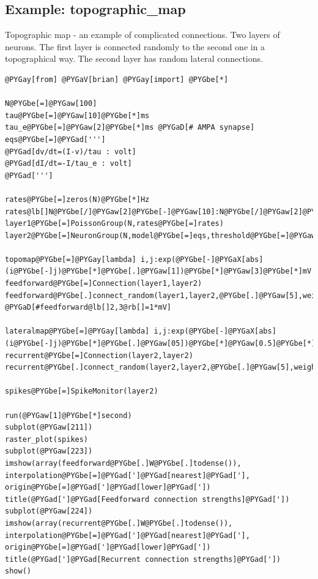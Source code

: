 \documentclass[letterpaper,10pt]{manual}
\begin{document}
\resetcurrentobjects
{}

\hypertarget{index-57}{}\subsection{Example: topographic\_map}

Topographic map - an example of complicated connections.
Two layers of neurons.
The first layer is connected randomly to the second one in a
topographical way.
The second layer has random lateral connections.

\begin{Verbatim}[commandchars=@\[\]]
@PYGay[from] @PYGaV[brian] @PYGay[import] @PYGbe[*]

N@PYGbe[=]@PYGaw[100]
tau@PYGbe[=]@PYGaw[10]@PYGbe[*]ms
tau_e@PYGbe[=]@PYGaw[2]@PYGbe[*]ms @PYGaD[# AMPA synapse]
eqs@PYGbe[=]@PYGad[''']
@PYGad[dv/dt=(I-v)/tau : volt]
@PYGad[dI/dt=-I/tau_e : volt]
@PYGad[''']

rates@PYGbe[=]zeros(N)@PYGbe[*]Hz
rates@lb[]N@PYGbe[/]@PYGaw[2]@PYGbe[-]@PYGaw[10]:N@PYGbe[/]@PYGaw[2]@PYGbe[+]@PYGaw[10]@rb[]@PYGbe[=]ones(@PYGaw[20])@PYGbe[*]@PYGaw[30]@PYGbe[*]Hz
layer1@PYGbe[=]PoissonGroup(N,rates@PYGbe[=]rates)
layer2@PYGbe[=]NeuronGroup(N,model@PYGbe[=]eqs,threshold@PYGbe[=]@PYGaw[10]@PYGbe[*]mV,reset@PYGbe[=]@PYGaw[0]@PYGbe[*]mV)

topomap@PYGbe[=]@PYGay[lambda] i,j:exp(@PYGbe[-]@PYGaX[abs](i@PYGbe[-]j)@PYGbe[*]@PYGbe[.]@PYGaw[1])@PYGbe[*]@PYGaw[3]@PYGbe[*]mV
feedforward@PYGbe[=]Connection(layer1,layer2)
feedforward@PYGbe[.]connect_random(layer1,layer2,@PYGbe[.]@PYGaw[5],weight@PYGbe[=]topomap)
@PYGaD[#feedforward@lb[]2,3@rb[]=1*mV]

lateralmap@PYGbe[=]@PYGay[lambda] i,j:exp(@PYGbe[-]@PYGaX[abs](i@PYGbe[-]j)@PYGbe[*]@PYGbe[.]@PYGaw[05])@PYGbe[*]@PYGaw[0.5]@PYGbe[*]mV
recurrent@PYGbe[=]Connection(layer2,layer2)
recurrent@PYGbe[.]connect_random(layer2,layer2,@PYGbe[.]@PYGaw[5],weight@PYGbe[=]lateralmap)

spikes@PYGbe[=]SpikeMonitor(layer2)

run(@PYGaw[1]@PYGbe[*]second)
subplot(@PYGaw[211])
raster_plot(spikes)
subplot(@PYGaw[223])
imshow(array(feedforward@PYGbe[.]W@PYGbe[.]todense()), interpolation@PYGbe[=]@PYGad[']@PYGad[nearest]@PYGad['], origin@PYGbe[=]@PYGad[']@PYGad[lower]@PYGad['])
title(@PYGad[']@PYGad[Feedforward connection strengths]@PYGad['])
subplot(@PYGaw[224])
imshow(array(recurrent@PYGbe[.]W@PYGbe[.]todense()), interpolation@PYGbe[=]@PYGad[']@PYGad[nearest]@PYGad['], origin@PYGbe[=]@PYGad[']@PYGad[lower]@PYGad['])
title(@PYGad[']@PYGad[Recurrent connection strengths]@PYGad['])
show()
\end{Verbatim}
\end{document}
